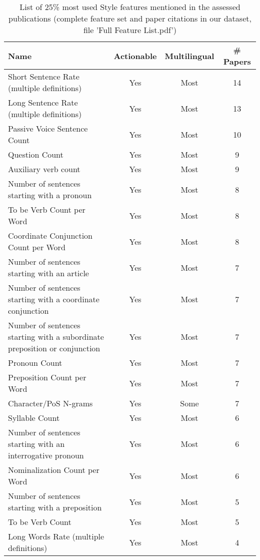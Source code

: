 \begin{table}[htbp]
    \caption{List of 25\% most used Style features mentioned in the assessed publications (complete feature set and paper citations in our dataset, file 'Full Feature List.pdf')}
    \label{tab:feat_Style}
    \centering
    \begin{tabular}{m{} c c c}
        \toprule
        \textbf{Name} & \textbf{Actionable} & \textbf{Multilingual} & \textbf{\# Papers} \\ 
        \midrule
        Short Sentence Rate (multiple definitions)  & Yes & Most & 14 \\
        Long Sentence Rate (multiple definitions) & Yes & Most & 13 \\
        Passive Voice Sentence Count & Yes & Most & 10 \\
        Question Count & Yes & Most & 9 \\
        Auxiliary verb count & Yes & Most & 9 \\
        Number of sentences starting with a pronoun & Yes & Most & 8 \\
        To be Verb Count per Word & Yes & Most & 8 \\
        Coordinate Conjunction Count per Word & Yes & Most & 8 \\
        Number of sentences starting with an article & Yes & Most & 7 \\
        Number of sentences starting with a coordinate conjunction & Yes & Most & 7 \\
        Number of sentences starting with a subordinate preposition or conjunction & Yes & Most & 7 \\
        Pronoun Count & Yes & Most & 7 \\
        Preposition Count per Word & Yes & Most & 7 \\
        Character/PoS N-grams & Yes & Some & 7 \\
        Syllable Count & Yes & Most & 6 \\
        Number of sentences starting with an interrogative pronoun & Yes & Most & 6 \\
        Nominalization Count per Word & Yes & Most & 6 \\
        Number of sentences starting with a preposition & Yes & Most & 5 \\
        To be Verb Count & Yes & Most & 5 \\
        Long Words Rate (multiple definitions) & Yes & Most & 4 \\

\end{tabular}
\end{table}
